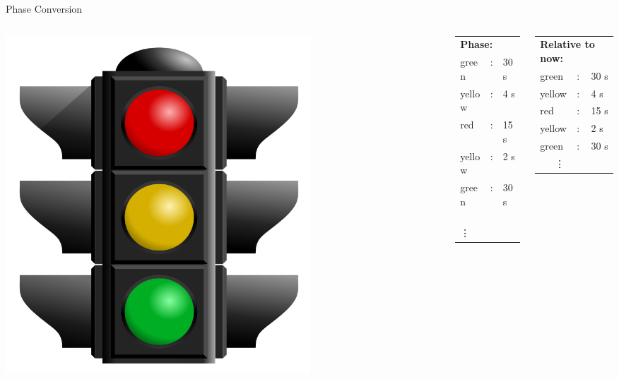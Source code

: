 \begin{frame}{Phase Conversion}
\begin{columns}
	\begin{column}{0.2\textwidth}
	\begin{center}
	\includegraphics[width=0.7\textwidth]{images/traffic_light.png}
	\end{center}
	\end{column}

	\begin{column}{0.4\textwidth}
	\begin{center}
	\begin{tabular}{lll}
	\multicolumn{3}{l}{\textbf{Phase:}} \\
	green & : & 30 s \\
	yellow & : &  4 s \\
	red & : & 15 s \\
	yellow & : & 2 s \\
	green & : & 30 s\\
	\ \ \ \vdots&&\\
	\end{tabular}
	\end{center}
	\end{column}

	\begin{column}{0.4\textwidth}
	\begin{center}
	\begin{tabular}{lll}
	\multicolumn{3}{l}{\textbf{Relative to now:}} \\
	green & : & 30 s \\
	yellow & : &  4 s \\
	red & : & 15 s \\
	yellow & : & 2 s \\
	green & : & 30 s\\
	\ \ \ \vdots&&\\
	\end{tabular}
	\end{center}
	\end{column}
\end{columns}
\end{frame}

